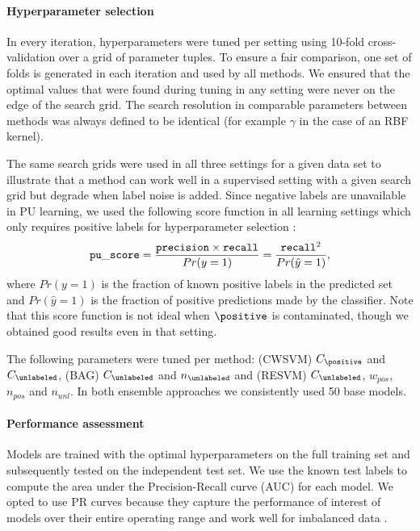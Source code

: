 

\paragraph{Hyperparameter selection}
In every iteration, hyperparameters were tuned per setting using 10-fold cross-validation over a grid of parameter tuples. To ensure a fair comparison, one set of folds is generated in each iteration and used by all methods. We ensured that the optimal values that were found during tuning in any setting were never on the edge of the search grid. The search resolution in comparable parameters between methods was always defined to be identical (for example $\gamma$ in the case of an RBF kernel). 

The same search grids were used in all three settings for a given data set to illustrate that a method can work well in a supervised setting with a given search grid but degrade when label noise is added. Since negative labels are unavailable in PU learning, we used the following score function in all learning settings which only requires positive labels for hyperparameter selection \citep{Lee03learningwith}:
\begin{equation}
{\tt pu\_score} = \frac{\mathtt{precision}\times \mathtt{recall}}{Pr(y=1)} =
\frac{\mathtt{recall}^2}{Pr(\hat{y}=1)},
\label{puscore}
\end{equation}
where $Pr(y=1)$ is the fraction of known positive labels in the predicted set and $Pr(\hat{y}=1)$ is the fraction of positive predictions made by the classifier. Note that this score function is not ideal when $\positive$ is contaminated, though we obtained good results even in that setting.

The following parameters were tuned per method: (CWSVM) $C_{\positive}$ and $C_{\unlabeled}$, (BAG) $C_{\unlabeled}$ and $n_{\unlabeled}$ and (RESVM) $C_{\unlabeled}$, $w_{pos}$, $n_{pos}$ and $n_{unl}$. In both ensemble approaches we consistently used 50 base models.


\paragraph{Performance assessment} Models are trained with the optimal hyperparameters on the full training set and subsequently tested on the independent test set. We use the known test labels to compute the area under the Precision-Recall curve (AUC) for each model. We opted to use PR curves because they capture the performance of interest of models over their entire operating range and work well for imbalanced data \citep{Davis:2006:RPR:1143844.1143874}. 

